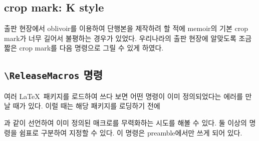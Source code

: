 \documentclass[
	12pt,
	a4paper,
	kosection,
	footnote,
	microtype,
	figtabcapt,
]{oblivoir}
\def\cs#1{\texttt{\textbackslash #1}}
\newcommand\xobclass{x\-ob\-liv\-oir\oblivoirallowbreak}
\newcommand\obclass{ob\-liv\-oir\oblivoirallowbreak}
\def\xetexko{\XeTeX-\ko}
\begin{document}

\subsection{crop mark: K style}

출판 현장에서 oblivoir를 이용하여 단행본을 제작하려 할 적에 \textsf{memoir}의
기본 crop mark가 너무 길어서 불평하는 경우가 있었다. 우리나라의 출판 현장에
알맞도록 조금 짧은 crop mark를 다음 명령으로 그릴 수 있게 하였다.
\begin{boxedverbatim}
\trimKmark
\end{boxedverbatim}

\subsection{\cs{ReleaseMacros} 명령}

여러 \LaTeX\ 패키지를 로드하여 쓰다 보면 어떤 명령이 이미 정의되었다는 에러를
만날 때가 있다. 이럴 때는 해당 패키지를 로딩하기 전에
\begin{boxedverbatim}
\ReleaseMacros{\XeTeX,\XeLaTeX}
\end{boxedverbatim}
과 같이 선언하여 이미 정의된 매크로를 무력화하는 시도를 해볼 수 있다.
둘 이상의 명령을 쉼표로 구분하여 지정할 수 있다.
이 명령은 preamble에서만 쓰게 되어 있다.




%
%
\end{document}
